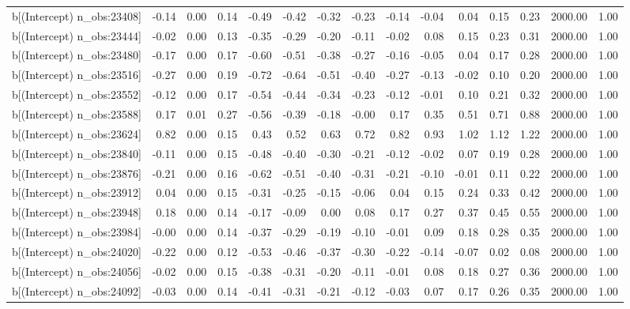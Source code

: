 \begin{table}[ht]
\begin{tabular}{rrrrrrrrrrrrrrr}
  b[(Intercept) n\_obs:23408] & -0.14 & 0.00 & 0.14 & -0.49 & -0.42 & -0.32 & -0.23 & -0.14 & -0.04 & 0.04 & 0.15 & 0.23 & 2000.00 & 1.00 \\ 
  b[(Intercept) n\_obs:23444] & -0.02 & 0.00 & 0.13 & -0.35 & -0.29 & -0.20 & -0.11 & -0.02 & 0.08 & 0.15 & 0.23 & 0.31 & 2000.00 & 1.00 \\ 
  b[(Intercept) n\_obs:23480] & -0.17 & 0.00 & 0.17 & -0.60 & -0.51 & -0.38 & -0.27 & -0.16 & -0.05 & 0.04 & 0.17 & 0.28 & 2000.00 & 1.00 \\ 
  b[(Intercept) n\_obs:23516] & -0.27 & 0.00 & 0.19 & -0.72 & -0.64 & -0.51 & -0.40 & -0.27 & -0.13 & -0.02 & 0.10 & 0.20 & 2000.00 & 1.00 \\ 
  b[(Intercept) n\_obs:23552] & -0.12 & 0.00 & 0.17 & -0.54 & -0.44 & -0.34 & -0.23 & -0.12 & -0.01 & 0.10 & 0.21 & 0.32 & 2000.00 & 1.00 \\ 
  b[(Intercept) n\_obs:23588] & 0.17 & 0.01 & 0.27 & -0.56 & -0.39 & -0.18 & -0.00 & 0.17 & 0.35 & 0.51 & 0.71 & 0.88 & 2000.00 & 1.00 \\ 
  b[(Intercept) n\_obs:23624] & 0.82 & 0.00 & 0.15 & 0.43 & 0.52 & 0.63 & 0.72 & 0.82 & 0.93 & 1.02 & 1.12 & 1.22 & 2000.00 & 1.00 \\ 
  b[(Intercept) n\_obs:23840] & -0.11 & 0.00 & 0.15 & -0.48 & -0.40 & -0.30 & -0.21 & -0.12 & -0.02 & 0.07 & 0.19 & 0.28 & 2000.00 & 1.00 \\ 
  b[(Intercept) n\_obs:23876] & -0.21 & 0.00 & 0.16 & -0.62 & -0.51 & -0.40 & -0.31 & -0.21 & -0.10 & -0.01 & 0.11 & 0.22 & 2000.00 & 1.00 \\ 
  b[(Intercept) n\_obs:23912] & 0.04 & 0.00 & 0.15 & -0.31 & -0.25 & -0.15 & -0.06 & 0.04 & 0.15 & 0.24 & 0.33 & 0.42 & 2000.00 & 1.00 \\ 
  b[(Intercept) n\_obs:23948] & 0.18 & 0.00 & 0.14 & -0.17 & -0.09 & 0.00 & 0.08 & 0.17 & 0.27 & 0.37 & 0.45 & 0.55 & 2000.00 & 1.00 \\ 
  b[(Intercept) n\_obs:23984] & -0.00 & 0.00 & 0.14 & -0.37 & -0.29 & -0.19 & -0.10 & -0.01 & 0.09 & 0.18 & 0.28 & 0.35 & 2000.00 & 1.00 \\ 
  b[(Intercept) n\_obs:24020] & -0.22 & 0.00 & 0.12 & -0.53 & -0.46 & -0.37 & -0.30 & -0.22 & -0.14 & -0.07 & 0.02 & 0.08 & 2000.00 & 1.00 \\ 
  b[(Intercept) n\_obs:24056] & -0.02 & 0.00 & 0.15 & -0.38 & -0.31 & -0.20 & -0.11 & -0.01 & 0.08 & 0.18 & 0.27 & 0.36 & 2000.00 & 1.00 \\ 
  b[(Intercept) n\_obs:24092] & -0.03 & 0.00 & 0.14 & -0.41 & -0.31 & -0.21 & -0.12 & -0.03 & 0.07 & 0.17 & 0.26 & 0.35 & 2000.00 & 1.00 \\ 

\end{tabular}
\end{table}
